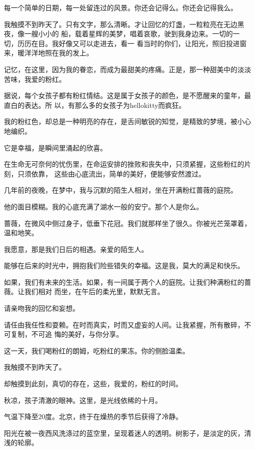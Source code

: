 \documentclass[12pt,a4paper]{article}
\begin{document}
		每一个简单的日期，每一处留连过的风景。你还会记得么。你还会记得我么。

		我触摸不到昨天了。只有文字，那么清晰。才让回忆的灯盏，一粒粒亮在无边黑夜，像一艘小小的
	船，载着星辉的美梦，唱着哀歌，驶到我身边来。一切的一切，历历在目。我好像又可以走进去，看一
	看当时的你们，让阳光，照旧投进窗来，暖洋洋地照在我的发上。

		记忆，在这里，因为我的眷恋，而成为最甜美的疼痛。正是，那一种甜美中的淡淡苦味，我爱的粉红。

		据说，每个女孩子都有粉红情结。这是属于女孩子的颜色，是不愿醒来的童年，最直白的表达。所
	以，有那么多的女孩子为hellokitty而疯狂。

		我的粉红色，却总是一种明亮的存在，是舌间敏锐的知觉，是精致的梦境，被小心地编织。\par
		它是幸福，是瞬间里涌起的欣喜。

		在生命无可奈何的忧伤里，在命运安排的挫败和丧失中，只须紧握，这些粉红的片刻，只须依靠，
	这些由心底流出，简单的美好，便能够安然渡过。

		几年前的夜晚，在梦中，我与沉默的陌生人相对，坐在开满粉红蔷薇的庭院。\par
		他的面目模糊。我的心底充满了湖水一般的安宁。那个人是你么。\par
		蔷薇，在微风中侧过身子，低垂下花冠。我们就那样坐了很久。你被光芒笼罩着，温和地笑。\par
		我愿意，那是我们日后的相遇。亲爱的陌生人。\par
		能够在后来的时光中，拥抱我们险些错失的幸福。这是我，莫大的满足和快乐。

		如果，我们有未来的生活。如果，有一间属于两个人的庭院。让我们种满粉红的蔷薇。让我们相对
	而坐，在午后的柔光里，默默无言。

		请亲吻我的回忆和妄想。

		请任由我任性和耍赖。在时而真实，时而又虚妄的人间。让我紧握，所有散碎，不可复制，不可追
	悔的美好，与你分享。

		这一天，我们喝粉红的朗姆，吃粉红的果冻。你的侧脸温柔。\par
		我触摸不到昨天了。\par
		却触摸到此刻，真切的存在，这些，我爱的，粉红的时间。

	\endwriting



		秋凉，孩子清澈的眼神。这里，是光线依稀的十月。

		气温下降至20度。北京，终于在燥热的季节后获得了冷静。\par
		阳光在被一夜西风洗涤过的蓝空里，呈现着迷人的透明。树影子，是淡定的灰，清浅的轮廓。
\end{document}
